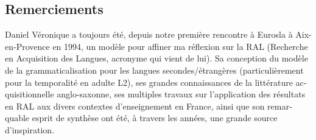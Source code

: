 \documentclass[french, output=paper]{langscibook}
\begin{document}
\begin{otherlanguage}{french}
\section*{Remerciements}
Daniel Véronique a toujours été, depuis notre première rencontre à Eurosla à Aix-en-Provence en 1994, un modèle pour affiner ma réflexion sur la RAL (Recherche en Acquisition des Langues, acronyme qui vient de lui). Sa conception du modèle de la grammaticalisation pour les langues secondes/étrangères (particulièrement pour la temporalité en adulte L2), ses grandes connaissances de la littérature acquisitionnelle anglo-saxonne, ses multiples travaux sur l’application des résultats en RAL aux divers contextes d’enseignement en France, ainsi que son remarquable esprit de synthèse ont été, à travers les années, une grande source d’inspiration.

\sloppy\printbibliography[heading=subbibliography,notkeyword=this]
\end{otherlanguage}
\end{document}
